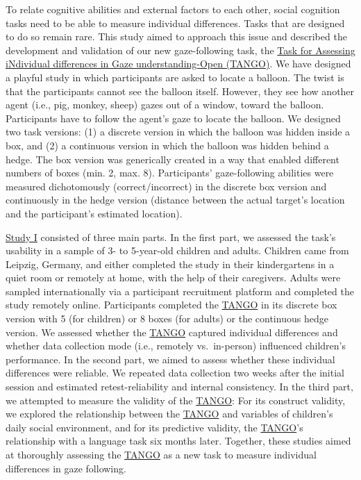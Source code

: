 \documentclass[
]{scrbook}
\begin{document}
To relate cognitive abilities and external factors to each other, social cognition tasks need to be able to measure individual differences. Tasks that are designed to do so remain rare. This study aimed to approach this issue and described the development and validation of our new gaze-following task, the \hyperref[acronyms_TANGO]{Task for Assessing iNdividual differences in Gaze understanding-Open (TANGO)}. We have designed a playful study in which participants are asked to locate a balloon. The twist is that the participants cannot see the balloon itself. However, they see how another agent (i.e., pig, monkey, sheep) gazes out of a window, toward the balloon. Participants have to follow the agent's gaze to locate the balloon. We designed two task versions: (1) a discrete version in which the balloon was hidden inside a box, and (2) a continuous version in which the balloon was hidden behind a hedge. The box version was generically created in a way that enabled different numbers of boxes (min. 2, max. 8). Participants' gaze-following abilities were measured dichotomously (correct/incorrect) in the discrete box version and continuously in the hedge version (distance between the actual target's location and the participant's estimated location).

\hyperref[studyI]{Study I} consisted of three main parts. In the first part, we assessed the task's usability in a sample of 3- to 5-year-old children and adults. Children came from Leipzig, Germany, and either completed the study in their kindergartens in a quiet room or remotely at home, with the help of their caregivers. Adults were sampled internationally via a participant recruitment platform and completed the study remotely online. Participants completed the \hyperref[acronyms_TANGO]{TANGO} in its discrete box version with 5 (for children) or 8 boxes (for adults) or the continuous hedge version. We assessed whether the \hyperref[acronyms_TANGO]{TANGO} captured individual differences and whether data collection mode (i.e., remotely vs.~in-person) influenced children's performance. In the second part, we aimed to assess whether these individual differences were reliable. We repeated data collection two weeks after the initial session and estimated retest-reliability and internal consistency. In the third part, we attempted to measure the validity of the \hyperref[acronyms_TANGO]{TANGO}: For its construct validity, we explored the relationship between the \hyperref[acronyms_TANGO]{TANGO} and variables of children's daily social environment, and for its predictive validity, the \hyperref[acronyms_TANGO]{TANGO}'s relationship with a language task six months later. Together, these studies aimed at thoroughly assessing the \hyperref[acronyms_TANGO]{TANGO} as a new task to measure individual differences in gaze following.
\end{document}
